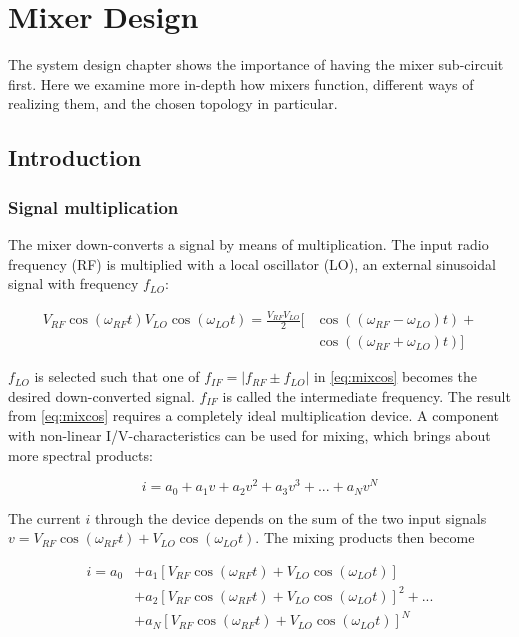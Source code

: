 \chapter{Mixer Design}\label{ch:mixer}

	The system design chapter shows the importance of having the mixer sub-circuit first. Here we examine more in-depth how mixers function, different ways of realizing them, and the chosen topology in particular.

	\section{Introduction}
		\subsection{Signal multiplication}\label{sec:mixer_introduction}
			The mixer down-converts a signal by means of multiplication. The input radio frequency (RF) is multiplied with a local oscillator (LO), an external sinusoidal signal with frequency $f_{LO}$:
			
			\begin{align} \label{eq:mixcos}	V_{RF}\cos(\omega_{RF}t)V_{LO}\cos(\omega_{LO}t)=\frac{V_{RF}V_{LO}}{2}\big[ & \cos((\omega_{RF}-\omega_{LO})t) + \nonumber \\
				& \cos((\omega_{RF}+\omega_{LO})t) \big]
			\end{align}
			
			$f_{LO}$ is selected such that one of $f_{IF}=|f_{RF}\pm f_{LO}|$ in \autoref{eq:mixcos} becomes the desired down-converted signal. $f_{IF}$ is called the intermediate frequency.\autocite{maas92} The result from \autoref{eq:mixcos} requires a completely ideal multiplication device. A component with non-linear I/V-characteristics can be used for mixing, which brings about more spectral products: \autocite{bahl03}

			\begin{equation}\label{eq:poweriv}
				i = a_0 + a_1v + a_2v^2 + a_3v^3 + ... + a_Nv^N
			\end{equation}

			The current $i$ through the device depends on the sum of the two input signals $v=V_{RF}\cos(\omega_{RF}t) + V_{LO}\cos(\omega_{LO}t)$. The mixing products then become

			\begin{align}\label{eq:mixedseries}
				i = a_0 &+ a_1\left[ V_{RF}\cos(\omega_{RF}t) + V_{LO}\cos(\omega_{LO}t) \right] \nonumber \\
				& + a_2\left[ V_{RF}\cos(\omega_{RF}t) + V_{LO}\cos(\omega_{LO}t) \right]^2 + ... \nonumber \\
				& + a_N\left[ V_{RF}\cos(\omega_{RF}t) + V_{LO}\cos(\omega_{LO}t) \right]^N
			\end{align}


